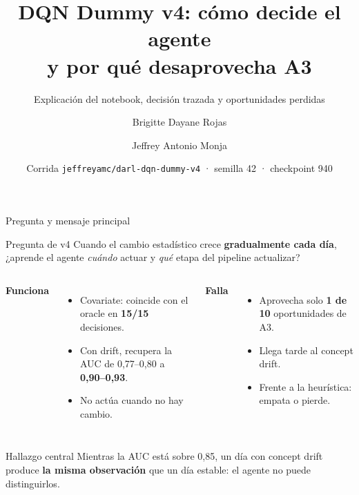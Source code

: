 \documentclass[aspectratio=169,10pt,xcolor=table]{beamer}
\title[DARL DQN Dummy v4]{DQN Dummy v4: cómo decide el agente\\y por qué desaprovecha A3}
\subtitle{Explicación del notebook, decisión trazada y oportunidades perdidas}
\author{Brigitte Dayane Rojas \and Jeffrey Antonio Monja}
\institute{Proyecto de tesis DARL}
\date{Corrida \texttt{jeffreyamc/darl-dqn-dummy-v4} · semilla 42 · checkpoint 940}
\newcommand{\hl}[1]{\textcolor{DARLblue}{\textbf{#1}}}
\begin{document}
\begin{frame}
  \titlepage
\end{frame}

\begin{frame}{Pregunta y mensaje principal}
\begin{block}{Pregunta de v4}
Cuando el cambio estadístico crece \textbf{gradualmente cada día}, ¿aprende el
agente \emph{cuándo} actuar y \emph{qué} etapa del pipeline actualizar?
\end{block}
\vspace{0.6em}
\begin{columns}[T]
\textbf{Funciona}
\begin{itemize}
  \item Covariate: coincide con el oracle en \hl{15/15} decisiones.
  \item Con drift, recupera la AUC de 0,77--0,80 a \hl{0,90--0,93}.
  \item No actúa cuando no hay cambio.
\end{itemize}
\textbf{Falla}
\begin{itemize}
  \item Aprovecha solo \textcolor{DARLred}{\textbf{1 de 10}} oportunidades de A3.
  \item Llega tarde al concept drift.
  \item Frente a la heurística: empata o pierde.
\end{itemize}
\end{columns}
\vspace{0.6em}
\begin{alertblock}{Hallazgo central}
Mientras la AUC está sobre 0,85, un día con concept drift produce
\textbf{la misma observación} que un día estable: el agente no puede distinguirlos.
\end{alertblock}
\end{frame}

\end{document}
